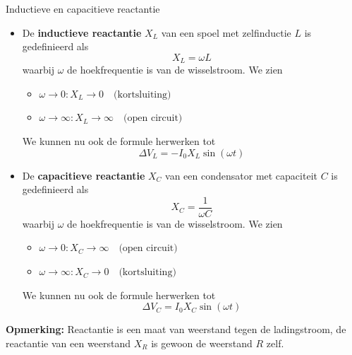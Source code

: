 \newpage

\begin{theo}{Inductieve en capacitieve reactantie}
    \begin{itemize}
        \item   De \textbf{inductieve reactantie} $X_{L}$ van een spoel met zelfinductie $L$ is gedefinieerd als
                    \begin{equation*}
                        X_{L} = \omega L
                    \end{equation*}
                waarbij $\omega$ de hoekfrequentie is van de wisselstroom. We zien 
                \begin{itemize}
                    \item $ \omega \to 0: X_{L} \to 0 \quad \text{(kortsluiting)} $
                    \item $ \omega \to \infty: X_{L} \to \infty \quad \text{(open circuit)} $
                \end{itemize}
                We kunnen nu ook de formule herwerken tot
                \begin{equation*}
                    \Delta V_{L} = -I_{0}X_{L}\sin(\omega t)
                \end{equation*}
        \item    De \textbf{capacitieve reactantie} $X_{C}$ van een condensator met capaciteit $C$ is gedefinieerd als
                    \begin{equation*}
                        X_{C} = \dfrac{1}{\omega C}
                    \end{equation*}
                waarbij $\omega$ de hoekfrequentie is van de wisselstroom. We zien
                \begin{itemize}
                    \item $ \omega \to 0: X_{C} \to \infty \quad \text{(open circuit)} $
                    \item $ \omega \to \infty: X_{C} \to 0 \quad \text{(kortsluiting)}$
                \end{itemize}
                We kunnen nu ook de formule herwerken tot
                \begin{equation*}
                    \Delta V_{C} = I_{0}X_{C}\sin(\omega t)
                \end{equation*}
    \end{itemize}
    \vspace{0.3cm}
    \noindent \textbf{Opmerking:} Reactantie is een maat van weerstand tegen de ladingstroom, de reactantie van een weerstand $X_{R}$ is gewoon de weerstand $R$ zelf.
\end{theo}

